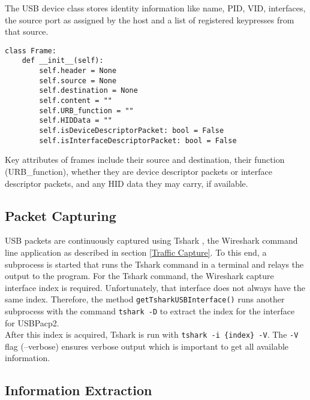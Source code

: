 The USB device class stores identity information like name, PID, VID, interfaces, the source port as assigned by the host and a list of registered keypresses from that source.

\begin{lstlisting}[caption={Frame class definition},captionpos=b]
class Frame:
    def __init__(self):
        self.header = None
        self.source = None
        self.destination = None
        self.content = ""
        self.URB_function = ""
        self.HIDData = ""
        self.isDeviceDescriptorPacket: bool = False
        self.isInterfaceDescriptorPacket: bool = False
\end{lstlisting}

Key attributes of frames include their source and destination, their function \\ (URB\_function), whether they are device descriptor packets or interface descriptor packets, and any HID data they may carry, if available.


\subsection{Packet Capturing}

USB packets are continuously captured using Tshark \cite{TsharkTsharkDev}, the Wireshark command line application as described in section \ref{Traffic Capture}. To this end, a subprocess is started that runs the Tshark command in a terminal and relays the output to the program.
For the Tshark command, the Wireshark capture interface index is required. Unfortunately, that interface does not always have the same index. Therefore, the method \verb|getTsharkUSBInterface()| runs another subprocess with the command \verb|tshark -D| to extract the index for the interface for USBPacp2.  \\
After this index is acquired, Tshark is run with \verb|tshark -i {index} -V|. The \verb|-V| flag (--verbose) ensures verbose output which is important to get all available information.  


\subsection{Information Extraction}

